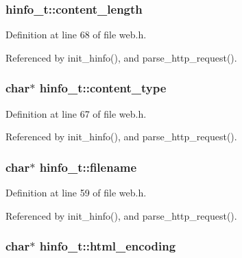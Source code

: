 \subsubsection[{\texorpdfstring{content\+\_\+length}{content_length}}]{ hinfo\+\_\+t\+::content\+\_\+length}\hypertarget{structhinfo__t_a6cf5714c0fe8e8e7f7819194274f9052}{}\label{structhinfo__t_a6cf5714c0fe8e8e7f7819194274f9052}


Definition at line 68 of file web.\+h.



Referenced by init\+\_\+hinfo(), and parse\+\_\+http\+\_\+request().

\subsubsection[{\texorpdfstring{content\+\_\+type}{content_type}}]{\setlength{\rightskip}{0pt plus 5cm}char$\ast$ hinfo\+\_\+t\+::content\+\_\+type}\hypertarget{structhinfo__t_a87bad5ce6af7ed3613a61d01aef94d8d}{}\label{structhinfo__t_a87bad5ce6af7ed3613a61d01aef94d8d}


Definition at line 67 of file web.\+h.



Referenced by init\+\_\+hinfo(), and parse\+\_\+http\+\_\+request().

\subsubsection[{\texorpdfstring{filename}{filename}}]{\setlength{\rightskip}{0pt plus 5cm}char$\ast$ hinfo\+\_\+t\+::filename}\hypertarget{structhinfo__t_a874ffdf5ade4e3844d7719444495e89c}{}\label{structhinfo__t_a874ffdf5ade4e3844d7719444495e89c}


Definition at line 59 of file web.\+h.



Referenced by init\+\_\+hinfo(), and parse\+\_\+http\+\_\+request().

\subsubsection[{\texorpdfstring{html\+\_\+encoding}{html_encoding}}]{\setlength{\rightskip}{0pt plus 5cm}char$\ast$ hinfo\+\_\+t\+::html\+\_\+encoding}\hypertarget{structhinfo__t_ac03bcdde52e49a14bf9112f295f216b5}{}\label{structhinfo__t_ac03bcdde52e49a14bf9112f295f216b5}


